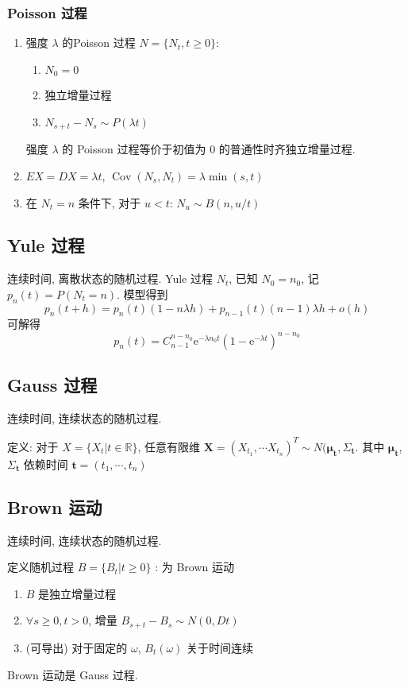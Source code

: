\documentclass[11pt,a4paper,twocolumn]{article} %
\numberwithin{equation}{section} %
\renewcommand*{\vec}[1]{\bm{#1}} %
\newcommand\e{\mathrm{e}} %
\DeclareMathOperator\cov{Cov}
\begin{document}
\subsubsection{Poisson 过程} %
\label{ssub:poisson_process}
\begin{enumerate}
	\item 强度 $\lambda$ 的Poisson 过程 $N = \{N_t, t\ge 0\}$: 
	\begin{enumerate}
		\item $N_0 = 0$
		\item 独立增量过程
		\item $N_{s+t} - N_s \sim P(\lambda t)$
	\end{enumerate}
	强度 $\lambda$ 的 Poisson 过程等价于初值为 $0$ 的普通性时齐独立增量过程.
	\item $EX = DX = \lambda t$, $\cov(N_s, N_t) = \lambda\min(s,t)$ 
	\item 在 $N_t=n$ 条件下, 对于 $u<t$: $N_u \sim B(n, u/t)$
\end{enumerate}
\subsection{Yule 过程} %
\label{sub:yule}
连续时间, 离散状态的随机过程.
Yule 过程 $N_t$, 已知 $N_0 = n_0$, 记 $p_n(t) = P(N_t = n)$. 模型得到
$$
  p_n(t+h) = p_n(t)(1-n\lambda h) + p_{n-1}(t)(n-1)\lambda h + o(h)
$$
可解得
\begin{equation}
	p_n(t) = C_{n-1}^{n-n_0}\e^{-\lambda n_0 t}
	\left(1-\e^{-\lambda t}\right)^{n-n_0}
\end{equation}
\subsection{Gauss 过程} %
\label{sub:gauss_process}
连续时间, 连续状态的随机过程.

定义: 对于 $X = \{ X_t|t\in\mathbb R\}$, 任意有限维 
$\vec X = (X_{t_1},\cdots X_{t_n})^T \sim N(\vec \mu_{\vec t}, \Sigma_{\vec t}$. 
其中 $\vec\mu_{\vec t}$, $\Sigma_{\vec t}$ 依赖时间 
$\vec t = (t_1, \cdots, t_n)$
\subsection{Brown 运动} %
\label{sub:brown_motion}
连续时间, 连续状态的随机过程.

定义随机过程 $B = \{B_t|t\ge 0\}$ : 为 Brown 运动 
\begin{enumerate}
	\item $B$ 是独立增量过程
	\item $\forall s\ge 0, t > 0$, 增量 $B_{s+t} - B_s \sim N(0,Dt)$
	\item (可导出) 对于固定的 $\omega$, $B_t(\omega)$ 关于时间连续
\end{enumerate}
Brown 运动是 Gauss 过程. 
\end{document}
